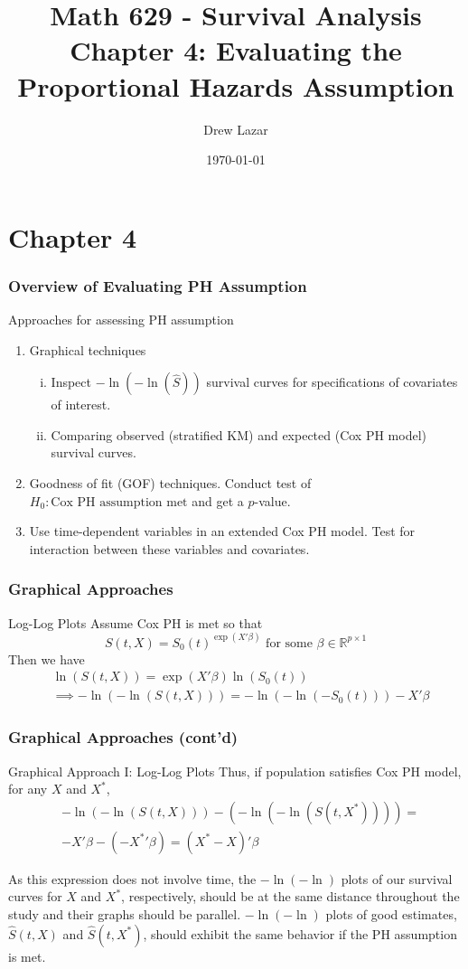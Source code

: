 \documentclass{beamer}
\title{Math 629 - Survival Analysis \\ Chapter 4: Evaluating the Proportional Hazards Assumption}
\author{Drew Lazar}
\institute{Ball State University}
\date{\today}
\theoremstyle{definition}
\begin{document}
\begin{frame}
    \titlepage
\end{frame}



\section{Chapter 4}
\begin{frame}
\frametitle{Overview of Evaluating PH Assumption}
\begin{block}{Approaches for assessing PH assumption}
\begin{enumerate}
\item Graphical techniques
\begin{enumerate}[i.]
\item Inspect $-\ln(-\ln(\hat{S}))$ survival curves for specifications of covariates of interest.
\item Comparing observed (stratified KM) and expected (Cox PH model) survival curves.
\end{enumerate}
\item Goodness of fit (GOF) techniques. Conduct test of $H_0: \text{Cox PH assumption met}$ and get a $p$-value.
\item Use time-dependent variables in an extended Cox PH model. Test for interaction between these variables and covariates.
\end{enumerate}
\end{block}
\end{frame}
\begin{frame}
\frametitle{Graphical Approaches}
\begin{block}{Log-Log Plots}
Assume Cox PH is met so that
\[ S(t,X) = S_0(t)^{\exp(X'\beta)} \text{ for some }  \beta \in \mathbb{R}^{p\times1}
\]
Then we have
\begin{align*}
&\ln( S(t,X)) = \exp(X'\beta)\ln(S_0(t)) \\
&\implies -\ln(-\ln(S(t,X))) = -\ln(-\ln(-S_0(t))) - X'\beta
\end{align*}
\end{block}
\end{frame}

\begin{frame}
\frametitle{Graphical Approaches (cont'd)}
\begin{block}{Graphical Approach I: Log-Log Plots}
Thus, if population satisfies Cox PH model, for any $X$ and $X^*$,
\begin{align*}
&-\ln(-\ln(S(t,X)))- (-\ln(-\ln(S(t,X^*)))) = \\
&-X'\beta - (-{X^*}'\beta) =(X^*-X)'\beta
\end{align*}
\end{block}
As this expression does not involve time, the  $-\ln(-\ln)$ plots of our survival curves for $X$ and $X^*$, respectively, should be at the same distance throughout the study and their graphs should be parallel. $-\ln(-\ln)$ plots of good estimates, $\hat{S}(t,X)$ and $\hat{S}(t,X^*)$, should exhibit the same behavior if the PH assumption is met.
\end{frame}
\end{document}
